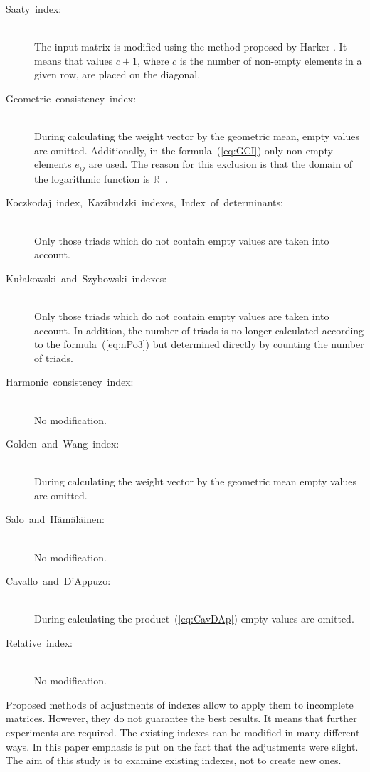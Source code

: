 \begin{description}
\item[Saaty index:] \hfill \\ 
	The input matrix is modified using the method proposed by Harker \cite{HARKER1987}. It means that values $c+1$, where $c$ is the number of non-empty elements in a given row, are placed on the diagonal.

\item[Geometric consistency index:] \hfill \\
	During calculating the weight vector by the geometric mean, empty values are omitted. Additionally, in the formula~(\ref{eq:GCI}) only non-empty elements $e_{ij}$ are used. The reason for this exclusion is that the domain of the logarithmic function is $\mathbb{R}^{+}$.

\item[Koczkodaj index, Kazibudzki indexes, Index of determinants:] \hfill \\ 
  Only those triads which do not contain empty values are taken into account.

\item[Kułakowski and Szybowski indexes:] \hfill \\ 
	Only those triads which do not contain empty values are taken into account. In addition, the number of triads is no longer calculated according to the formula~(\ref{eq:nPo3}) but determined directly by counting the number of triads.

\item[Harmonic consistency index:] \hfill \\ 
  No modification.

\item[Golden and Wang index:] \hfill \\ 
  During calculating the weight vector by the geometric mean empty values are omitted.

\item[Salo and Hämäläinen:] \hfill \\ 
  No modification.

\item[Cavallo and D'Appuzo:] \hfill \\
	During calculating the product~(\ref{eq:CavDAp}) empty values are omitted.

\item[Relative index:] \hfill \\ 
  No modification.
\end{description}

Proposed methods of adjustments of indexes allow to apply them to incomplete matrices. However, they do not guarantee the best results. It means that further experiments are required. The existing indexes can be modified in many different ways. In this paper emphasis is put on the fact that the adjustments were slight. The aim of this study is to examine existing indexes, not to create new ones.